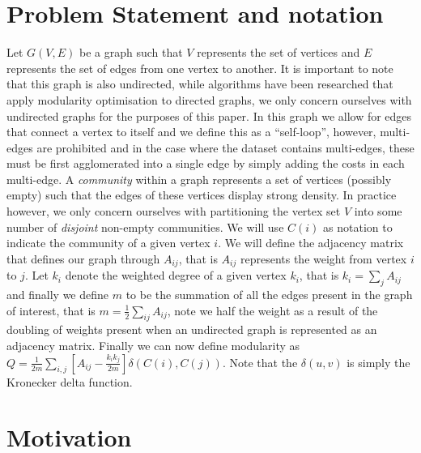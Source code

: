 \section{Problem Statement and notation}
Let $G(V,E)$ be a graph such that $V$ represents the set of vertices and $E$ represents the set of edges from one vertex to another. It is important to note that this graph is also undirected, while algorithms have been researched that apply modularity optimisation to directed graphs, we only concern ourselves with undirected graphs for the purposes of this paper. In this graph we allow for edges that connect a vertex to itself and we define this as a ``self-loop'', however, multi-edges are prohibited and in the case where the dataset contains multi-edges, these must be first agglomerated into a single edge by simply adding the costs in each multi-edge. 
A \textit{community} within a graph represents a set of vertices (possibly empty) such that the edges of these vertices display strong density. In practice however, we only concern ourselves with partitioning the vertex set $V$ into some number of \textit{disjoint} non-empty communities. We will use $C(i)$ as notation to indicate the community of a given vertex $i$. 
We will define the adjacency matrix that defines our graph through $A_{ij}$, that is $A_{ij}$ represents the weight from vertex $i$ to $j$. Let $k_i$ denote the weighted degree of a given vertex $k_i$, that is $k_i = \sum_{j}A_{ij}$ and finally we define $m$ to be the summation of all the edges present in the graph of interest, that is $m = \frac{1}{2}\sum_{ij}A_{ij}$, note we half the weight as a result of the doubling of weights present when an undirected graph is represented as an adjacency matrix. Finally we can now define modularity as $Q=\frac{1}{2 m} \sum_{i, j}\left[A_{i j}-\frac{k_{i} k_{j}}{2 m}\right] \delta\left(C(i), C(j)\right)$. Note that the $\delta\left(u,v\right)$ is simply the Kronecker delta function.  

\section{Motivation}
